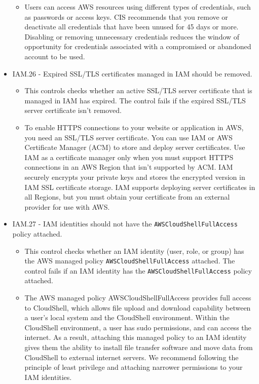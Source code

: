 \begin{mdframed}[backgroundcolor=gray!05, linecolor=gray!50]
\begin{itemize}
\begin{itemize}
        \item Users can access AWS resources using different types of credentials, such as passwords or access keys. CIS recommends that you remove or deactivate all credentials that have been unused for 45 days or more. Disabling or removing unnecessary credentials reduces the window of opportunity for credentials associated with a compromised or abandoned account to be used.
    \end{itemize}
    \item IAM.26 - Expired SSL/TLS certificates managed in IAM should be removed.
    \begin{itemize}
        \item This controls checks whether an active SSL/TLS server certificate that is managed in IAM has expired. The control fails if the expired SSL/TLS server certificate isn't removed.
        \item To enable HTTPS connections to your website or application in AWS, you need an SSL/TLS server certificate. You can use IAM or AWS Certificate Manager (ACM) to store and deploy server certificates. Use IAM as a certificate manager only when you must support HTTPS connections in an AWS Region that isn't supported by ACM. IAM securely encrypts your private keys and stores the encrypted version in IAM SSL certificate storage. IAM supports deploying server certificates in all Regions, but you must obtain your certificate from an external provider for use with AWS. 
    \end{itemize}
    \item IAM.27 -  IAM identities should not have the \texttt{AWSCloudShellFullAccess} policy attached.
    \begin{itemize}
        \item This control checks whether an IAM identity (user, role, or group) has the AWS managed policy \texttt{AWSCloudShellFullAccess} attached. The control fails if an IAM identity has the \texttt{AWSCloudShellFullAccess} policy attached.
        \item The AWS managed policy AWSCloudShellFullAccess provides full access to CloudShell, which allows file upload and download capability between a user's local system and the CloudShell environment. Within the CloudShell environment, a user has sudo permissions, and can access the internet. As a result, attaching this managed policy to an IAM identity gives them the ability to install file transfer software and move data from CloudShell to external internet servers. We recommend following the principle of least privilege and attaching narrower permissions to your IAM identities.

\end{itemize}
\end{itemize}
\end{mdframed}
